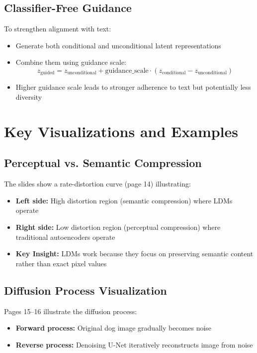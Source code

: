 \subsection*{Classifier-Free Guidance}
To strengthen alignment with text:
\begin{itemize}
    \item Generate both conditional and unconditional latent representations
    \item Combine them using guidance scale:
    \[
    z_\text{guided} = z_\text{unconditional} + \text{guidance\_scale} \cdot (z_\text{conditional} - z_\text{unconditional})
    \]
    \item Higher guidance scale leads to stronger adherence to text but potentially less diversity
\end{itemize}
\section{Key Visualizations and Examples}

\subsection*{Perceptual vs. Semantic Compression}
The slides show a rate-distortion curve (page 14) illustrating:
\begin{itemize}
    \item \textbf{Left side:} High distortion region (semantic compression) where LDMs operate
    \item \textbf{Right side:} Low distortion region (perceptual compression) where traditional autoencoders operate
    \item \textbf{Key Insight:} LDMs work because they focus on preserving semantic content rather than exact pixel values
\end{itemize}

\subsection*{Diffusion Process Visualization}
Pages 15–16 illustrate the diffusion process:
\begin{itemize}
    \item \textbf{Forward process:} Original dog image gradually becomes noise
    \item \textbf{Reverse process:} Denoising U-Net iteratively reconstructs image from noise
\end{itemize}

